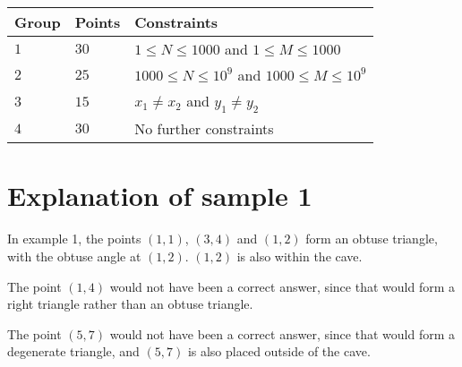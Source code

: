 \noindent
\begin{tabular}{| l | l | l |}
\hline
Group & Points & Constraints \\ \hline
$1$    & $30$         & $1\leq N \leq 1000$ and $1\leq M \leq 1000$ \\ \hline
$2$    & $25$          & $1000\leq N\leq 10^9$ and $1000\leq M \leq 10^9$ \\ \hline
$3$    & $15$          & $x_1 \neq x_2$ and $y_1 \neq y_2$ \\ \hline
$4$    & $30$         & No further constraints \\ \hline
\end{tabular}

\section*{Explanation of sample 1}
In example 1, the points $(1,1)$, $(3,4)$ and $(1,2)$ form an obtuse triangle, with the obtuse angle at $(1,2)$. $(1,2)$ is also within the cave.

The point $(1,4)$ would not have been a correct answer, since that would form a right triangle rather than an obtuse triangle.

The point $(5,7)$ would not have been a correct answer, since that would form a degenerate triangle, and $(5,7)$ is also placed outside of the cave.
